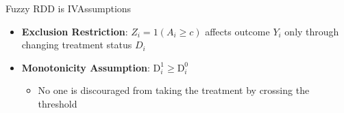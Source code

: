 \documentclass[dvipsnames,hyperref={pdfpagelabels=false}]{beamer}
\begin{document}
\begin{frame}{Fuzzy RDD is IV}{Assumptions}
	\begin{itemize}
		
		
		\item \textbf{Exclusion Restriction}: $Z_{i}=1(A_i\geq c)$ affects outcome $Y_{i}$ only through changing treatment status $D_{i}$
		\vspace{0.2cm}
		\item \textbf{Monotonicity Assumption}: $\mathrm{D}^{1}_{i} \geq \mathrm{D}^{0}_{i}$
		\vspace{0.2cm}
		\begin{itemize}
			\item No one is discouraged from taking the treatment by crossing
			the threshold
		\end{itemize}
		
		
	\end{itemize}
\end{frame}
\end{document}

